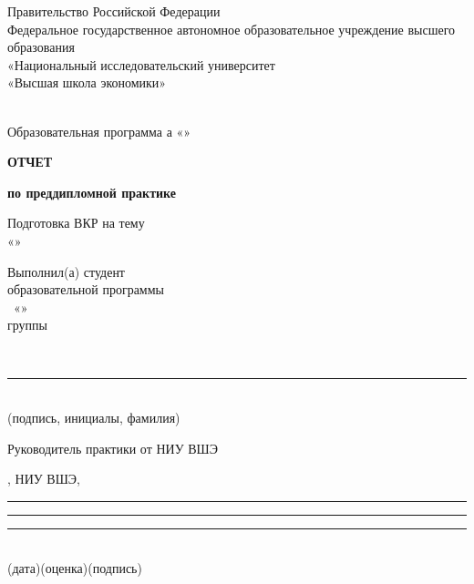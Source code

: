\documentclass[12pt,a4paper]{extarticle}
\begin{document}
\pagestyle{empty}
\sloppy
\setlength{\parindent}{0pt}
\setlength{\parskip}{0pt}
\singlespacing

\begin{center}
Правительство Российской Федерации\\
Федеральное государственное автономное образовательное учреждение высшего образования\\
«Национальный исследовательский университет\\
«Высшая школа экономики»

\vspace{1.2em}
\hseFaculty\\
Образовательная программа \hseDegreeLevel{}а «\hseSpecialization»

\vspace{2.6em}
\textbf{\large ОТЧЕТ}

\vspace{0.4em}
\textbf{по преддипломной практике}

\vspace{0.9em}
Подготовка ВКР на тему\\
«\hseProjectName»
\end{center}

\vspace{2.8em}
\noindent\hfill
\begin{minipage}[t]{0.55\textwidth}
\raggedright
Выполнил(а) студент\\
образовательной программы\\
\hseProgramCode\ «\hseSpecialization»\\
группы \hseGroup

\vspace{0.6em}
\strut\hseAuthorName\\[-0.05cm]
\rule{6cm}{0.4pt}\\[-0.05cm]
{\scriptsize (подпись, инициалы, фамилия)}
\end{minipage}

\vspace{1.6em}
Руководитель практики от НИУ ВШЭ

\smallskip
\hseSupervisorName, НИУ ВШЭ, \hseSupervisorTitle

\vspace{0.7em}
\rule{2.6cm}{0.4pt}\quad\rule{3.2cm}{0.4pt}\quad{}\rule{4.2cm}{0.4pt}\\
{\scriptsize \hspace{0.4cm}(дата)\hspace{2.4cm}(оценка)\hspace{3.2cm}(подпись)}
\end{document}
